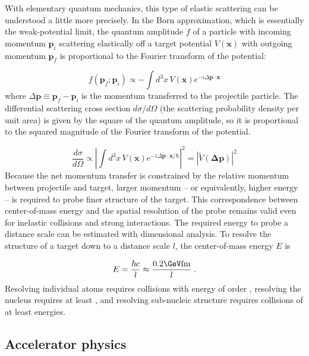With elementary quantum mechanics, this type of elastic scattering can be understood a little more precisely.
In the Born approximation, which is essentially the weak-potential limit, the quantum amplitude $f$ of a particle with incoming momentum $\mathbf{p}_{i}$ scattering elastically off a target potential $V(\mathbf{x})$ with outgoing momentum $\mathbf{p}_{f}$ is proportional to the Fourier transform of the potential:

\begin{equation}
  f\left(\mathbf{p}_f ; \mathbf{p}_i\right) \propto - \int d^3 x \, V(\mathbf{x}) e^{-i \Delta \mathbf{p} \cdot \mathbf{x}}
  \label{eqn:born}
\end{equation}
where $\Delta \mathbf{p} \equiv \mathbf{p}_f - \mathbf{p}_i$ is the momentum transferred to the projectile particle.
The differential scattering cross section $d\sigma/d\Omega$ (the scattering probability density per unit area) is given by the square of the quantum amplitude, so it is proportional to the squared magnitude of the Fourier transform of the potential.

\begin{equation}
  \frac{d\sigma}{d\Omega} \propto \left| \int d^3 x \, V(\mathbf{x}) e^{-i \Delta \mathbf{p} \cdot \mathbf{x} / \hbar} \right|^2 = \left| \tilde{V}(\mathbf{\Delta \mathbf{p}}) \right|^2
\end{equation}
Because the net momentum transfer is constrained by the relative momentum between projectile and target, larger momentum -- or equivalently, higher energy -- is required to probe finer structure of the target.
This correspondence between center-of-mass energy and the spatial resolution of the probe remains valid even for inelastic collisions and strong interactions.
The required energy to probe a distance scale can be estimated with dimensional analysis.
To resolve the structure of a target down to a distance scale $l$, the center-of-mass energy $E$ is

\begin{equation}
E = \frac{\hbar c}{l} \approx \frac{0.2 \GeV \fm}{l} \; .
\end{equation}
Resolving individual atoms requires collisions with energy of order \keV, resolving the nucleus requires at least \MeV, and resolving sub-nucleic structure requires collisions of at least \GeV energies.

\subsection{Accelerator physics}

